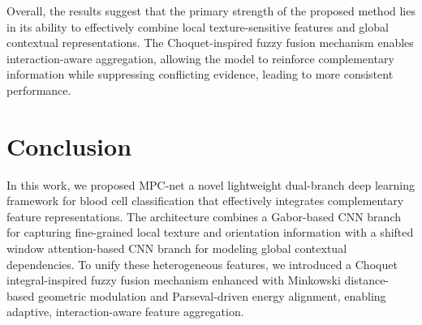 \documentclass[preprint,12pt]{elsarticle}
\begin{document}
\begin{table}[!h]
\centering
\caption{Performance of different model variants on the Raabin-WBC dataset}
\vspace{3pt}
\label{tab:ablation_Raabin-WBC}
\end{table}

Overall, the results suggest that the primary strength of the proposed method lies in its ability to effectively combine local texture-sensitive features and global contextual representations. The Choquet-inspired fuzzy fusion mechanism enables interaction-aware aggregation, allowing the model to reinforce complementary information while suppressing conflicting evidence, leading to more consistent performance.




\FloatBarrier
 \section{Conclusion}
In this work, we proposed MPC-net a novel lightweight dual-branch deep learning framework for blood cell classification that effectively integrates complementary feature representations. The architecture combines a Gabor-based CNN branch for capturing fine-grained local texture and orientation information with a shifted window attention-based CNN branch for modeling global contextual dependencies. To unify these heterogeneous features, we introduced a Choquet integral-inspired fuzzy fusion mechanism enhanced with Minkowski distance-based geometric modulation and Parseval-driven energy alignment, enabling adaptive, interaction-aware feature aggregation.
\end{document}
